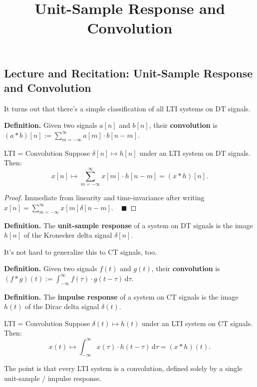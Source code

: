 \title{Unit-Sample Response and Convolution}



\subsection{Lecture and Recitation: Unit-Sample Response and Convolution}

It turns out that there's a simple classification
of all LTI systems on DT signals.

\textbf{Definition.} Given two signals $a[n]$ and $b[n]$,
their \textbf{convolution} is $(a * b)[n] := \sum_{m = -\infty}^{\infty} a[m] \cdot b[n - m]$.

\begin{theorem}{LTI = Convolution}
    Suppose $\delta[n] \mapsto h[n]$ under an LTI system on DT signals.  Then:
    \[ x[n] \mapsto \sum_{m = -\infty}^{\infty} x[m] \cdot h[n - m] = (x * h)[n]. \]
\end{theorem}

\begin{proof}
    Immediate from linearity and time-invariance
    after writing $x[n] = \sum_{m = -\infty}^{\infty} x[m] \delta[n - m]$.
    ~ $\blacksquare$
\end{proof}

\textbf{Definition.} The \textbf{unit-sample response} of a system on DT signals
is the image $h[n]$ of the Kronecker delta signal $\delta[n]$.

It's not hard to generalize this to CT signals, too.

\textbf{Definition.} Given two signals $f(t)$ and $g(t)$,
their \textbf{convolution} is $(f * g)(t) := \int_{-\infty}^{\infty}
f(\tau) \cdot g(t - \tau) \, \mathrm{d}\tau$.

\textbf{Definition.} The \textbf{impulse response} of a system on CT signals
is the image $h(t)$ of the Dirac delta signal $\delta(t)$.

\begin{theorem}{LTI = Convolution}
    Suppose $\delta(t) \mapsto h(t)$ under an LTI system on CT signals.  Then:
    \[ x(t) \mapsto \int_{-\infty}^{\infty} x(\tau) \cdot h(t - \tau) \, \mathrm{d}\tau
    = (x * h)(t). \]
\end{theorem}

The point is that every LTI system is a convolution,
defined solely by a single unit-sample / impulse response.

